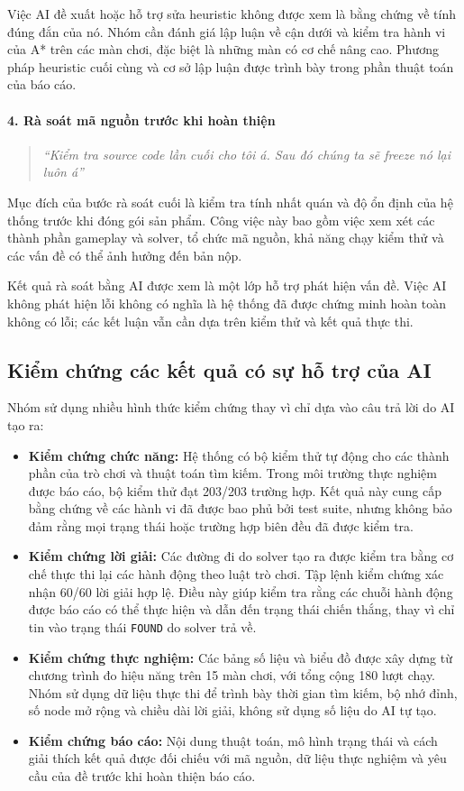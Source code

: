 Việc AI đề xuất hoặc hỗ trợ sửa heuristic không được xem là bằng chứng về tính đúng đắn của nó. Nhóm cần đánh giá lập luận về cận dưới và kiểm tra hành vi của A* trên các màn chơi, đặc biệt là những màn có cơ chế nâng cao. Phương pháp heuristic cuối cùng và cơ sở lập luận được trình bày trong phần thuật toán của báo cáo.

\paragraph{4. Rà soát mã nguồn trước khi hoàn thiện}
\begin{quote}
\textit{``Kiểm tra source code lần cuối cho tôi á. Sau đó chúng ta sẽ freeze nó lại luôn á''}
\end{quote}

Mục đích của bước rà soát cuối là kiểm tra tính nhất quán và độ ổn định của hệ thống trước khi đóng gói sản phẩm. Công việc này bao gồm việc xem xét các thành phần gameplay và solver, tổ chức mã nguồn, khả năng chạy kiểm thử và các vấn đề có thể ảnh hưởng đến bản nộp.

Kết quả rà soát bằng AI được xem là một lớp hỗ trợ phát hiện vấn đề. Việc AI không phát hiện lỗi không có nghĩa là hệ thống đã được chứng minh hoàn toàn không có lỗi; các kết luận vẫn cần dựa trên kiểm thử và kết quả thực thi.

\subsection{Kiểm chứng các kết quả có sự hỗ trợ của AI}

Nhóm sử dụng nhiều hình thức kiểm chứng thay vì chỉ dựa vào câu trả lời do AI tạo ra:
\begin{itemize}
    \item \textbf{Kiểm chứng chức năng:} Hệ thống có bộ kiểm thử tự động cho các thành phần của trò chơi và thuật toán tìm kiếm. Trong môi trường thực nghiệm được báo cáo, bộ kiểm thử đạt 203/203 trường hợp. Kết quả này cung cấp bằng chứng về các hành vi đã được bao phủ bởi test suite, nhưng không bảo đảm rằng mọi trạng thái hoặc trường hợp biên đều đã được kiểm tra.
    \item \textbf{Kiểm chứng lời giải:} Các đường đi do solver tạo ra được kiểm tra bằng cơ chế thực thi lại các hành động theo luật trò chơi. Tập lệnh kiểm chứng xác nhận 60/60 lời giải hợp lệ. Điều này giúp kiểm tra rằng các chuỗi hành động được báo cáo có thể thực hiện và dẫn đến trạng thái chiến thắng, thay vì chỉ tin vào trạng thái \texttt{FOUND} do solver trả về.
    \item \textbf{Kiểm chứng thực nghiệm:} Các bảng số liệu và biểu đồ được xây dựng từ chương trình đo hiệu năng trên 15 màn chơi, với tổng cộng 180 lượt chạy. Nhóm sử dụng dữ liệu thực thi để trình bày thời gian tìm kiếm, bộ nhớ đỉnh, số node mở rộng và chiều dài lời giải, không sử dụng số liệu do AI tự tạo.
    \item \textbf{Kiểm chứng báo cáo:} Nội dung thuật toán, mô hình trạng thái và cách giải thích kết quả được đối chiếu với mã nguồn, dữ liệu thực nghiệm và yêu cầu của đề trước khi hoàn thiện báo cáo.
\end{itemize}

